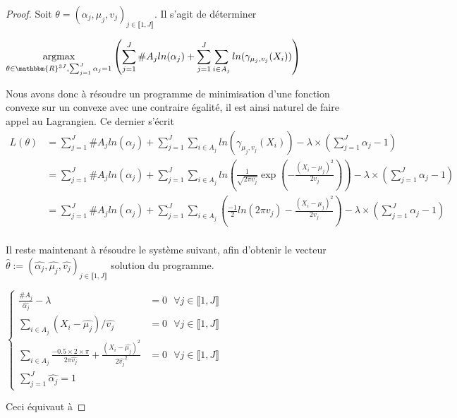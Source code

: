 \documentclass[frenchb]{report}
\newcommand{\R}{\mathbbm{R}}
\newcommand{\1}{\mathbbm{1}}
\theoremstyle{definition}\newtheorem{defn}{Définition}
\theoremstyle{definition}\newtheorem{exm}{Exemple}
\theoremstyle{definition}\newtheorem{nota}{Notation}
\theoremstyle{definition}\newtheorem{rem}{Remarque}
\begin{document}
\begin{proof}
Soit $\theta = (\alpha_j, \mu_j, v_j)_{j \in \llbracket 1,J \rrbracket}$. Il s'agit de déterminer 
\begin{center}
	$\underset{\theta\in\R^{3J}, \sum_{j=1}^J\alpha_j = 1}{\text{argmax}}\left(\displaystyle\sum_{j=1}^J \#A_j ln(\alpha_j)+ \sum_{j=1}^J\sum_{i\in A_j} ln(\gamma_{\mu_j, v_j}(X_i))\right)$
\end{center}
Nous avons donc à résoudre un programme de minimisation d'une fonction convexe sur un convexe avec une contraire égalité, il est ainsi naturel de faire appel au Lagrangien. \newline 
Ce dernier s'écrit
\begin{align*} 
L(\theta) &= \displaystyle\sum_{j=1}^J \#A_j ln(\alpha_j)+ \sum_{j=1}^J\sum_{i\in A_j} ln(\gamma_{\mu_j, v_j}(X_i)) - \lambda\times\left(\sum_{j=1}^J\alpha_j - 1\right)\\
&= \displaystyle\sum_{j=1}^J \#A_j ln(\alpha_j)+ \sum_{j=1}^J\sum_{i\in A_j} ln\left(\frac{1}{\sqrt{2\pi v_j}}\exp\left(-\frac{\left(X_i -\mu_j\right)^2}{2v_j} \right)\right) - \lambda\times\left(\sum_{j=1}^J\alpha_j - 1\right)\\
&= \displaystyle\sum_{j=1}^J \#A_j ln(\alpha_j)+ \sum_{j=1}^J\sum_{i\in A_j}\left( \frac{-1}{2}ln(2\pi v_j) -\frac{(X_i-\mu_j)^2}{2v_j}\right) - \lambda\times\left(\sum_{j=1}^J\alpha_j - 1\right)\\
\end{align*}

Il reste maintenant à résoudre le système suivant, afin d'obtenir le vecteur $\widehat{\theta} := (\widehat{\alpha_j}, \widehat{\mu_j}, \widehat{v_j})_{j\in\llbracket 1,J \rrbracket}$ solution du programme.

$
\begin{cases}
\displaystyle\frac{\#A_j}{\widehat{\alpha_j}} - \lambda &= 0 \text{ } \forall j \in \llbracket 1,J \rrbracket \\
\displaystyle\sum_{i\in A_j} (X_i-\widehat{\mu_j})/\widehat{v_j} & = 0 \text{ } \forall j \in \llbracket 1,J \rrbracket \\
\displaystyle\sum_{i\in A_j} \frac{-0.5 \times 2 \times \pi}{2\pi \widehat{v_j}} +\frac{(X_i-\widehat{\mu_j})^2}{2\widehat{v_j}^2} &= 0 \text{ } \forall j \in \llbracket 1,J \rrbracket\\
\displaystyle\sum_{j=1}^J \widehat{\alpha_j} = 1
\end{cases}
$

Ceci équivaut à 


\end{proof}
\end{document}
